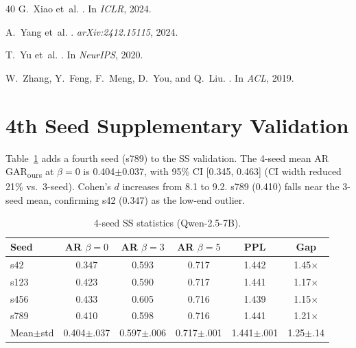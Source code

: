 \documentclass[11pt]{article}
\newcommand{\garours}{\textsc{GAR}\textsubscript{ours}}
\begin{document}
\begin{thebibliography}{40}
G.~Xiao et~al.
.
\newblock In \emph{ICLR}, 2024.

A.~Yang et~al.
.
\newblock \emph{arXiv:2412.15115}, 2024.

T.~Yu et~al.
.
\newblock In \emph{NeurIPS}, 2020.

W.~Zhang, Y.~Feng, F.~Meng, D.~You, and Q.~Liu.
.
\newblock In \emph{ACL}, 2019.

\end{thebibliography}

\appendix

\section{4th Seed Supplementary Validation}
\label{app:4seed}

Table~\ref{tab:4seed} adds a fourth seed (s789) to the SS validation. The 4-seed mean AR \garours{} at $\beta=0$ is 0.404$\pm$0.037, with 95\% CI [0.345, 0.463] (CI width reduced 21\% vs.\ 3-seed). Cohen's $d$ increases from 8.1 to 9.2. s789 (0.410) falls near the 3-seed mean, confirming s42 (0.347) as the low-end outlier.

\begin{table}[h]
\centering
\small
\caption{4-seed SS statistics (Qwen-2.5-7B).}
\label{tab:4seed}
\begin{tabular}{lccccc}
\toprule
\textbf{Seed} & \textbf{AR $\beta{=}0$} & \textbf{AR $\beta{=}3$} & \textbf{AR $\beta{=}5$} & \textbf{PPL} & \textbf{Gap} \\
\midrule
s42 & 0.347 & 0.593 & 0.717 & 1.442 & 1.45$\times$ \\
s123 & 0.423 & 0.590 & 0.717 & 1.441 & 1.17$\times$ \\
s456 & 0.433 & 0.605 & 0.716 & 1.439 & 1.15$\times$ \\
s789 & 0.410 & 0.598 & 0.716 & 1.441 & 1.21$\times$ \\
\midrule
Mean$\pm$std & 0.404$\pm$.037 & 0.597$\pm$.006 & 0.717$\pm$.001 & 1.441$\pm$.001 & 1.25$\pm$.14 \\
\bottomrule
\end{tabular}
\end{table}
\end{document}

